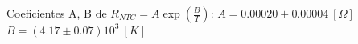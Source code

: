 
Coeficientes A, B de $R_{NTC} = A \exp(\frac{B}{T})$:
$A = 0.00020 \pm 0.00004\ [\Omega]$
$B = (4.17 \pm 0.07)10^3\ [K]$
